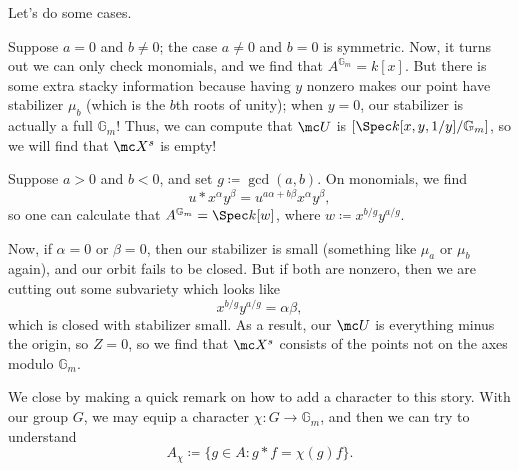 \documentclass{article}
\begin{document}
Let's do some cases.
\begin{listalph}
    \item Suppose $a=0$ and $b\ne0$; the case $a\ne0$ and $b=0$ is symmetric. Now, it turns out we can only check monomials, and we find that $A^{\mathbb G_m}=k[x]$. But there is some extra stacky information because having $y$ nonzero makes our point have stabilizer $\mu_b$ (which is the $b$th roots of unity); when $y=0$, our stabilizer is actually a full $\mathbb G_m$! Thus, we can compute that $\mc U$ is $[\Spec k[x,y,1/y]/\mathbb G_m]$, so we will find that $\mc X^s$ is empty!

    \item Suppose $a>0$ and $b<0$, and set $g\coloneqq\gcd(a,b)$. On monomials, we find
    \[u*x^\alpha y^\beta=u^{a\alpha+b\beta}x^\alpha y^\beta,\]
    so one can calculate that $A^{\mathbb G_m}=\Spec k[w]$, where $w\coloneqq x^{b/g}y^{a/g}$.

    Now, if $\alpha=0$ or $\beta=0$, then our stabilizer is small (something like $\mu_a$ or $\mu_b$ again), and our orbit fails to be closed. But if both are nonzero, then we are cutting out some subvariety which looks like
    \[x^{b/g}y^{a/g}=\alpha\beta,\]
    which is closed with stabilizer small. As a result, our $\mc U$ is everything minus the origin, so $Z=0$, so we find that $\mc X^s$ consists of the points not on the axes modulo $\mathbb G_m$.
\end{listalph}
\begin{remark}
    We close by making a quick remark on how to add a character to this story. With our group $G$, we may equip a character $\chi\colon G\to\mathbb G_m$, and then we can try to understand
    \[A_\chi\coloneqq\{g\in A:g*f=\chi(g)f\}.\]
\end{remark}
\end{document}
